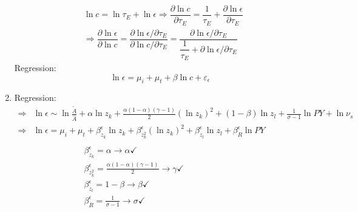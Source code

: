 \documentclass[12pt]{article} %
\begin{document}
\begin{enumerate}
    \begin{eqnarray*}
        &\ln c = \ln \tau_E + \ln \epsilon \Rightarrow \dfrac{\partial \ln c}{\partial \tau_E} = \dfrac{1}{\tau_E} + \dfrac{\partial \ln \epsilon}{\partial \tau_E}\\
        & \Rightarrow \dfrac{\partial \ln \epsilon}{\partial \ln c} = \dfrac{\partial \ln \epsilon / \partial \tau_E}{\partial \ln c/\partial \tau_E} = \dfrac{{\partial \ln \epsilon/\partial \tau_E}}{\dfrac{1}{\tau_E} + {\partial \ln \epsilon/\partial \tau_E}}
    \end{eqnarray*}
  Regression:
  \begin{equation*}
    \ln \epsilon = \mu_i + \mu_t + \beta \ln c + \varepsilon_{\epsilon}
  \end{equation*}

\item 
    Regression:
    \begin{equation*}
        \begin{split}
            \Rightarrow &\ln \epsilon \sim \ln \frac{\tilde{A}}{\hat{A}} + \alpha \ln z_k + \frac{\alpha(1-\alpha)(\gamma-1)}{2} (\ln z_k)^2 + (1-\beta) \ln {{z_l}} + \frac{1}{\sigma -1} \ln PY + \ln \nu_{s} \\
            \Rightarrow& \ln \epsilon = \mu_i + \mu_t + \beta_{z_k}^{\epsilon} \ln z_k + \beta_{z_k^2}^{\epsilon} (\ln z_k)^2 + \beta_{z_l}^{\epsilon} \ln z_l + \beta_{R}^{\epsilon} \ln PY  \\\\
            &     \qquad\qquad\qquad        \beta_{z_k}^{\epsilon} = \alpha \rightarrow \alpha \checkmark\\
            &     \qquad\qquad\qquad        \beta_{z_k^2}^{\epsilon} = \frac{\alpha(1-\alpha)(\gamma-1)}{2}\rightarrow \gamma \checkmark \\
            &     \qquad\qquad\qquad        \beta_{z_l}^{\epsilon} = 1-\beta \rightarrow \beta\checkmark\\
            &     \qquad\qquad\qquad        \beta_{R}^{\epsilon} = \frac{1}{\sigma -1} \rightarrow \sigma \checkmark
        \end{split}
    \end{equation*}



    
\end{enumerate}

\clearpage
\end{document}
